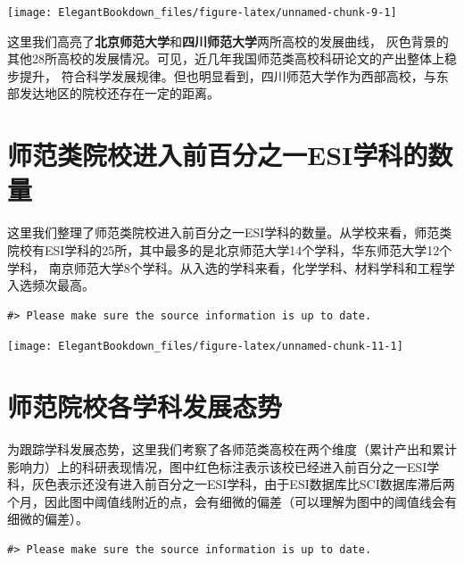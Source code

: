 \documentclass[cn, 11pt, fancy, hide]{elegantbook}
\begin{document}
\begin{center}\texttt{[image: ElegantBookdown\_files/figure-latex/unnamed-chunk-9-1]} \end{center}

这里我们高亮了\textbf{北京师范大学}和\textbf{四川师范大学}两所高校的发展曲线， 灰色背景的其他28所高校的发展情况。可见，近几年我国师范类高校科研论文的产出整体上稳步提升，
符合科学发展规律。但也明显看到，四川师范大学作为西部高校，与东部发达地区的院校还存在一定的距离。

\hypertarget{ux5e08ux8303ux7c7bux9662ux6821ux8fdbux5165ux524dux767eux5206ux4e4bux4e00esiux5b66ux79d1ux7684ux6570ux91cf}{%
\section{师范类院校进入前百分之一ESI学科的数量}\label{ux5e08ux8303ux7c7bux9662ux6821ux8fdbux5165ux524dux767eux5206ux4e4bux4e00esiux5b66ux79d1ux7684ux6570ux91cf}}

这里我们整理了师范类院校进入前百分之一ESI学科的数量。从学校来看，师范类院校有ESI学科的25所，其中最多的是北京师范大学14个学科，华东师范大学12个学科， 南京师范大学8个学科。从入选的学科来看，化学学科、材料学科和工程学入选频次最高。

\begin{verbatim}
#> Please make sure the source information is up to date.
\end{verbatim}

\begin{center}\texttt{[image: ElegantBookdown\_files/figure-latex/unnamed-chunk-11-1]} \end{center}

\hypertarget{ux5e08ux8303ux9662ux6821ux5404ux5b66ux79d1ux53d1ux5c55ux6001ux52bf}{%
\section{师范院校各学科发展态势}\label{ux5e08ux8303ux9662ux6821ux5404ux5b66ux79d1ux53d1ux5c55ux6001ux52bf}}

为跟踪学科发展态势，这里我们考察了各师范类高校在两个维度（累计产出和累计影响力）上的科研表现情况，图中红色标注表示该校已经进入前百分之一ESI学科，灰色表示还没有进入前百分之一ESI学科，由于ESI数据库比SCI数据库滞后两个月，因此图中阈值线附近的点，会有细微的偏差（可以理解为图中的阈值线会有细微的偏差）。

\begin{verbatim}
#> Please make sure the source information is up to date.
\end{verbatim}
\end{document}
